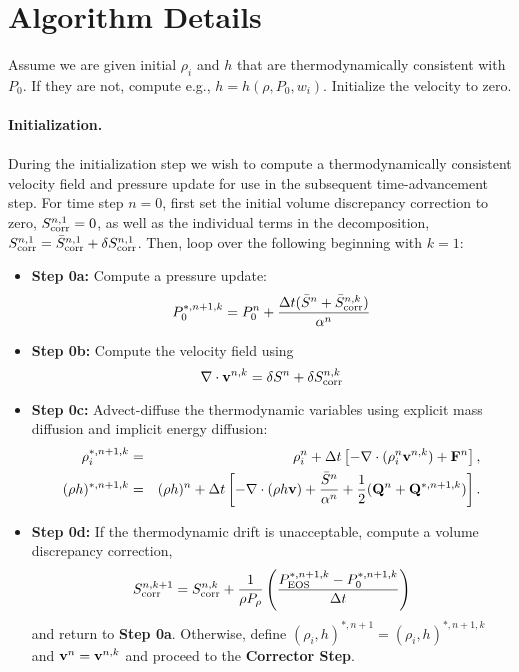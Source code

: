 \documentclass[final]{siamltex}
\def\Fb {{\bf F}}
\def\Qb {{\bf Q}}
\def\vb {{\bf v}}
\begin{document}
\section{Algorithm Details}
Assume we are given initial $\rho_i$ and $h$ that are thermodynamically consistent with 
$P_0$.  If they are not, compute e.g., $h = h(\rho,P_0,w_i)$.  Initialize the velocity
to zero.\\ \\
{\bf Initialization.}\\ \\
During the initialization step we wish to compute a thermodynamically consistent
velocity field and pressure update for use in the subsequent time-advancement step.
For time step $n=0$, first set the initial volume discrepancy correction to zero, 
$S_{\rm corr}^{n,1} = 0$, as well as the individual terms in the decomposition,
$S_{\rm corr}^{n,1} = \bar{S}_{\rm corr}^{n,1} + \delta S_{\rm corr}^{n,1}$.
Then, loop over the following beginning with $k=1$:\\
\begin{itemize}
\item {\bf Step 0a:} Compute a pressure update:
\begin{equation}
P_0^{*,n+1,k} = P_0^n + \frac{\Delta t(\bar{S}^n + \bar{S}_{\rm corr}^{n,k})}{\alpha^n}
\end{equation}
\item {\bf Step 0b:} Compute the velocity field using
\begin{equation}
\nabla\cdot\vb^{n,k} = \delta S^n + \delta S_{\rm corr}^{n,k}
\end{equation}
\item {\bf Step 0c:} Advect-diffuse the thermodynamic variables using explicit mass 
diffusion and implicit energy diffusion:
\begin{eqnarray}
\rho_i^{*,n+1,k} &=& \rho_i^n + \Delta t\left[-\nabla\cdot(\rho_i^n\vb^{n,k}) + \Fb^n\right], \\
(\rho h)^{*,n+1,k} &=& (\rho h)^n + \Delta t\left[-\nabla\cdot(\rho h\vb) + \frac{\bar{S}^n}{\alpha^n} + \frac{1}{2}(\Qb^n + \Qb^{*,n+1,k})\right].
\end{eqnarray}
\item {\bf Step 0d:} If the thermodynamic drift is unacceptable, compute a volume 
discrepancy correction,
\begin{equation}
S_{\rm corr}^{n,k+1} = S_{\rm corr}^{n,k} + \frac{1}{\rho P_\rho}\left(\frac{P_{\rm EOS}^{*,n+1,k} - P_0^{*,n+1,k}}{\Delta t}\right)
\end{equation}
and return to {\bf Step 0a}.  Otherwise, define 
$(\rho_i,h)^{*,n+1} = (\rho_i,h)^{*,n+1,k}$ and $\vb^n = \vb^{n,k}$ and proceed to 
the {\bf Corrector Step}.\\
\end{itemize}
\end{document}
